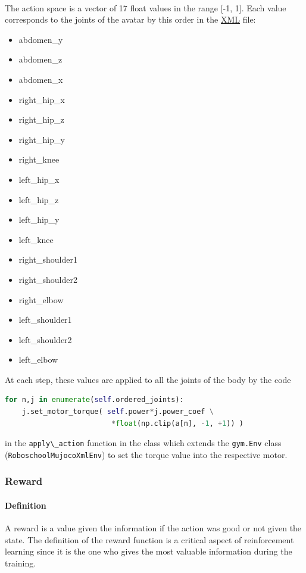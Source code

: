 \documentclass{article}
\begin{document}
\paragraph{}
The action space is a vector of 17 float values in the range [-1, 1]. Each
value corresponds to the joints of the avatar by this order in the 
\href{https://github.com/openai/roboschool/blob/master/roboschool/mujoco_assets/humanoid_symmetric.xml}{XML}
file:
\begin{multicols}{2}
  \begin{itemize}
  \item{abdomen\_y}
  \item{abdomen\_z}
  \item{abdomen\_x}
  \item{right\_hip\_x}
  \item{right\_hip\_z}
  \item{right\_hip\_y}
  \item{right\_knee}
  \item{left\_hip\_x}
  \item{left\_hip\_z}
  \item{left\_hip\_y}
  \item{left\_knee}
  \item{right\_shoulder1}
  \item{right\_shoulder2}
  \item{right\_elbow}
  \item{left\_shoulder1}
  \item{left\_shoulder2}
  \item{left\_elbow}
  \end{itemize}
\end{multicols}
  At each step, these values are applied to all the joints of the body by the code
\begin{lstlisting}[language=Python]
for n,j in enumerate(self.ordered_joints):
    j.set_motor_torque( self.power*j.power_coef \
                         *float(np.clip(a[n], -1, +1)) )
\end{lstlisting}

in the \verb?apply\_action? function in the class which extends the
\verb?gym.Env? class (\verb?RoboschoolMujocoXmlEnv?) to set the torque value
into the respective motor.

\subsubsection{Reward}

\paragraph{Definition} A reward is a value given the information if the action
was good or not given the state. The definition of the reward function is a
critical aspect of reinforcement learning since it is the one who gives the most
valuable information during the training.
\end{document}
